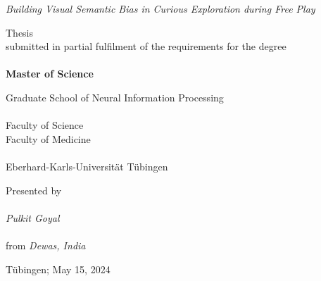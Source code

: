 \begin{titlepage}
    \begin{center}
        \vspace*{1cm}

        {\Large \textit{Building Visual Semantic Bias in Curious Exploration during Free Play}}

        \vspace{86pt}

        Thesis\\
        submitted in partial fulfilment of the requirements for the degree\\~\\
        {\textbf{Master of Science}}

        \vspace{76pt}

        Graduate School of Neural Information Processing\\~\\
        Faculty of Science\\
        Faculty of Medicine\\~\\
        Eberhard-Karls-Universität Tübingen

        \vspace{66pt}

        Presented by\\~\\
        \textit{Pulkit Goyal}\\~\\
        from \textit{Dewas, India}

        \vspace{56pt}

        Tübingen; May 15, 2024
    \end{center}
\end{titlepage}